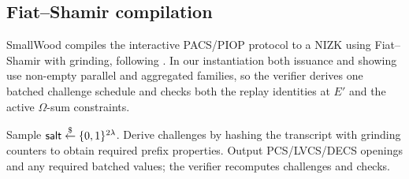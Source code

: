 \subsection{Fiat--Shamir compilation}
SmallWood compiles the interactive PACS/PIOP protocol to a NIZK using
Fiat--Shamir with grinding, following \cite{EPRINT:FenRiv25b}. In our
instantiation both issuance and showing use non-empty parallel and aggregated
families, so the verifier derives one batched challenge schedule and checks
both the replay identities at \(E'\) and the active \(\Omega\)-sum constraints.

\begin{algorithm}[H]
\caption{\textsf{PACS.ToNIZK} (Fiat--Shamir wrapper with grinding)}
\label{alg:pacs-tonizk}
\begin{algorithmic}[1]
\State Sample \(\textsf{salt}\overset{\$}{\leftarrow}\{0,1\}^{2\lambda}\).
\State Derive challenges by hashing the transcript with grinding counters to obtain required prefix properties.
\State Output PCS/LVCS/DECS openings and any required batched values; the verifier recomputes challenges and checks.
\end{algorithmic}
\end{algorithm}
